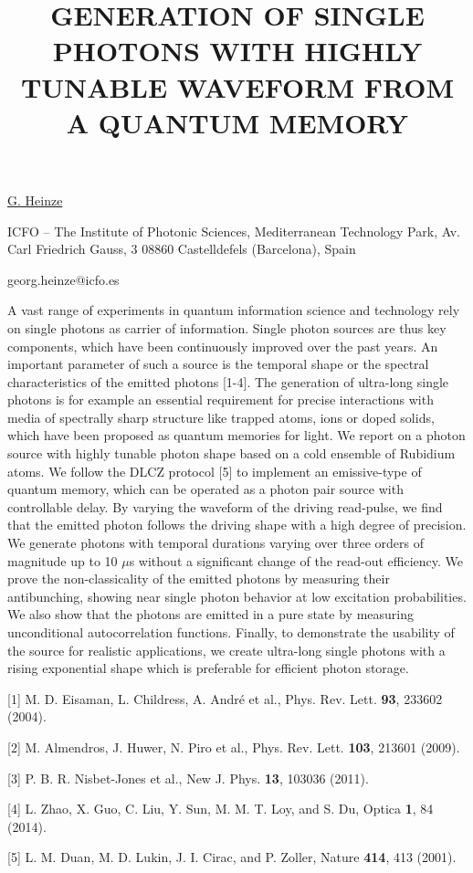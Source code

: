 \title{GENERATION OF SINGLE PHOTONS WITH HIGHLY TUNABLE WAVEFORM FROM A QUANTUM MEMORY}

\underline{G. Heinze} 

{\normalsize{\vspace{-4mm}
ICFO -- The Institute of Photonic Sciences,
Mediterranean Technology Park,
Av. Carl Friedrich Gauss, 3
08860 Castelldefels (Barcelona), Spain

\email georg.heinze@icfo.es}}

A vast range of experiments in quantum information science and technology rely on single photons as carrier of information. Single photon sources are thus key components, which have been continuously improved over the past years. An important parameter of such a source is the temporal shape or the spectral characteristics of the emitted photons [1-4]. The generation of ultra-long single photons is for example an essential requirement for precise interactions with media of spectrally sharp structure like trapped atoms, ions or doped solids, which have been proposed as quantum memories for light.
We report on a photon source with highly tunable photon shape based on a cold ensemble of Rubidium atoms. We follow the DLCZ protocol [5] to implement an emissive-type of quantum memory, which can be operated as a photon pair source with controllable delay. By varying the waveform of the driving read-pulse, we find that the emitted photon follows the driving shape with a high degree of precision. We generate photons with temporal durations varying over three orders of magnitude up to 10 $\mu$s without a significant change of the read-out efficiency. We prove the non-classicality of the emitted photons by measuring their antibunching, showing near single photon behavior at low excitation probabilities. We also show that the photons are emitted in a pure state by measuring unconditional autocorrelation functions. Finally, to demonstrate the usability of the source for realistic applications, we create ultra-long single photons with a rising exponential shape which is preferable for efficient photon storage.

{\normalsize
[1] M. D. Eisaman, L. Childress, A. Andr\'e et al., Phys. Rev. Lett. \textbf{93}, 233602 (2004).
\vsp

[2] M. Almendros, J. Huwer, N. Piro et al., Phys. Rev. Lett. \textbf{103}, 213601 (2009).
\vsp

[3] P. B. R. Nisbet-Jones et al., New J. Phys. \textbf{13}, 103036 (2011).
\vsp

[4] L. Zhao, X. Guo, C. Liu, Y. Sun, M. M. T. Loy, and S. Du, Optica \textbf{1}, 84 (2014).
\vsp

[5] L. M. Duan, M. D. Lukin, J. I. Cirac, and P. Zoller, Nature \textbf{414}, 413 (2001).
}

\vspace{\baselineskip}
